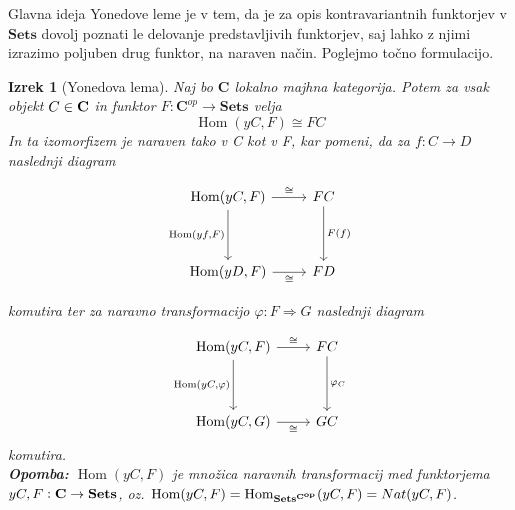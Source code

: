 \documentclass[12pt,a4paper]{book}
\theoremstyle{definition}
\theoremstyle{plain}
\newtheorem{izrek}[definicija]{Izrek}
\theoremstyle{definition}
\theoremstyle{remark}
\newcommand{\cat}[1]{\textbf{#1}}
\DeclareMathOperator{\Hom}{Hom}
\begin{document}
Glavna ideja Yonedove leme je v tem, da je za opis kontravariantnih funktorjev v $\cat{Sets}$ dovolj poznati le delovanje predstavljivih funktorjev, saj lahko z njimi izrazimo poljuben drug funktor, na naraven način. Poglejmo točno formulacijo.


\begin{izrek}[Yonedova lema]
Naj bo $\cat{C}$ lokalno majhna kategorija. Potem za vsak objekt $C \in \bf{C}$ in funktor $F : \textbf{C}^{op} \to \textbf{Sets}$ velja
$$\Hom(yC,F) \cong FC$$
In ta izomorfizem je naraven tako v C kot v F, kar pomeni, da za $f : C \to D$ naslednji diagram

\begin{equation} \label{diag1}
\begin{tikzcd}[row sep=huge]
\Hom(yC,F) \arrow[r, "\cong"] \arrow[d, "{\Hom(yf,F)}"'] & FC \arrow[d, "F(f)"] \\
\Hom(yD,F) \arrow[r, "\cong"'] & FD
\end{tikzcd}
\end{equation}


komutira ter za naravno transformacijo $\varphi : F \Rightarrow G$ naslednji diagram

\begin{equation} \label{diag2}
\begin{tikzcd}[row sep=huge]
\Hom(yC,F) \arrow[r, "\cong"] \arrow[d, "{\Hom(yC,}\varphi\text{)}"'] & FC \arrow[d, "\varphi_C"] \\
\Hom(yC,G) \arrow[r, "\cong"']	&	GC
\end{tikzcd}
\end{equation}
komutira. \\
\textbf{Opomba:} $\Hom(yC,F)$ je množica naravnih transformacij med funktorjema $yC,F : \bf{C} \to \bf{Sets}$, oz. $\Hom(yC,F) = \Hom_{\bf{Sets}^{\textbf{C}^{op}}}(yC,F) = Nat(yC,F)$.

\end{izrek}
\end{document}
